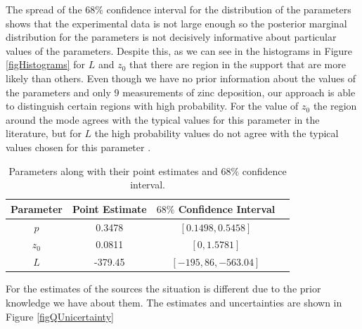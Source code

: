 \documentclass{sfuthesis}
\begin{document}
The spread of the $68\%$ confidence interval for the distribution
of the parameters shows that the experimental data is not large enough
so  the posterior marginal distribution for the parameters is 
not decisively informative about  particular 
values of the parameters. Despite this, 
as we can see in the histograms in Figure \ref{figHistograms} for
$L$ and $z_{0}$  that there are region in the support
that are more likely than others. Even though we have
no prior information about the values of the parameters and only 
$9$ measurements of zinc deposition, our approach is able
to distinguish certain regions with high probability. For the value of $z_{0}$
the region around the mode agrees with the typical values
for this parameter in the literature, but for $L$ the high
probability values do not agree with the typical
values chosen for this parameter \cite{hosseini2016airborne, seinfeld1998atmospheric}.

\begin{table}[H]
\centering
\begin{tabular}{|c|c|c|c|}
\hline 
Parameter & Point Estimate & $68\%$ Confidence Interval\tabularnewline
\hline 
\hline 
$p$ &  0.3478 & $[0.1498,0.5458]$\tabularnewline
\hline 
$z_{0}$ & 0.0811 & $[0,1.5781]$\tabularnewline
\hline 
$L$  & -379.45 & $[-195,86,-563.04]$\tabularnewline
\hline 
\end{tabular}
\caption{Parameters along with their  point estimates and $68\%$ confidence interval.}
\label{tabFinalEstimates}
\end{table}


For the estimates of the sources the situation
is different due to the prior knowledge we have
about them. The estimates and uncertainties are shown in 
Figure \ref{figQUnicertainty}
\end{document}
